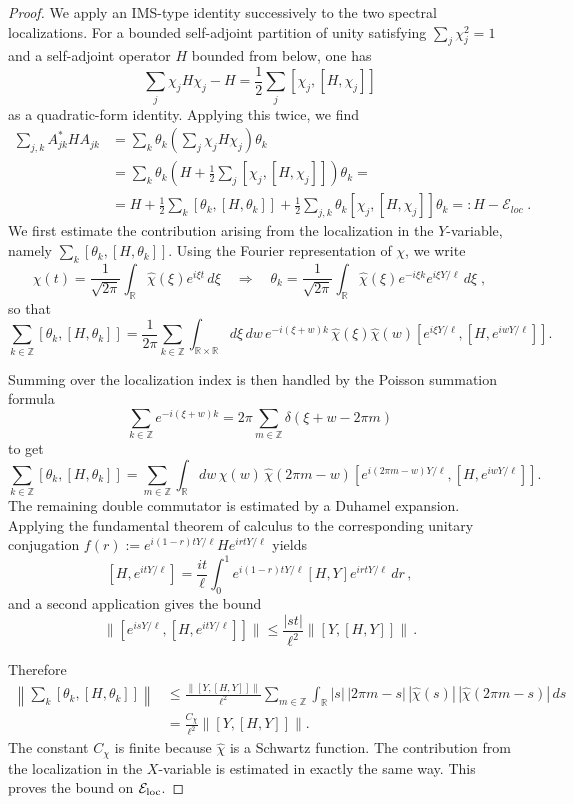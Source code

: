 \documentclass[11pt]{amsart}
\theoremstyle{definition}
\numberwithin{equation}{section}
\newcommand{\R}{\mathbb R}
\newcommand{\Z}{\mathbb Z}
\newcommand{\1}{\mathbf 1}
\begin{document}
\begin{proof}
We apply an IMS-type identity successively to the two spectral localizations. For a bounded self-adjoint partition of unity satisfying $\sum_j\chi_j^2=1$ and a self-adjoint operator $H$ bounded from below, one has
\[
 \sum_j\chi_j H\chi_j - H
 =
 \frac12\sum_j[\chi_j,[H,\chi_j]]
\]
as a quadratic-form identity. Applying this twice, we find
\begin{align*}
   \sum_{j,k}A_{jk}^*HA_{jk}
 &=\sum_k\theta_k\left(\sum_j\chi_jH\chi_j\right)\theta_k \\
 &=\sum_k\theta_k \left(H + \frac{1}{2}\sum_{j}\left[\chi_j,[H, \chi_j]\right]\right)\theta_k = \\
 &= H + \frac{1}{2}\sum_{k}\left[\theta_k,[H, \theta_k]\right] + \frac{1}{2}\sum_{j,k} \theta_k\left[\chi_j,[H, \chi_j]\right] \theta_k =: H - \mathcal{E}_{loc}\;.
\end{align*}
We first estimate the contribution arising from the localization in the $Y$-variable, namely $\sum_k [\theta_k,[H,\theta_k]]$.
Using the Fourier representation of $\chi$, we write
\[
 \chi(t)=\frac1{\sqrt{2\pi}}
 \int_{\R}\widehat\chi(\xi)e^{i \xi t}\,d\xi \quad\Longrightarrow\quad \theta_k
 =
 \frac1{\sqrt{2\pi}}
 \int_{\R}\widehat\chi(\xi) e^{-i \xi k}e^{i \xi Y/\ell}\,d\xi\;,
\]
so that
\[
\sum_{k \in \Z} [\theta_k,[H,\theta_k]] = \frac{1}{2\pi}\sum_{k \in \mathbb{Z}}\int_{\mathbb{R}\times\mathbb{R}}d\xi\,dw\,e^{-i(\xi + w) k}\,\hat{\chi}(\xi)\hat{\chi}(w)  \left[e^{i\xi Y/\ell}, \left[H, e^{i w Y/\ell}\right]  \right] .
\]

Summing over the localization index is then handled by the Poisson summation formula
\[
 \sum_{k\in\Z}e^{-i(\xi+w)k}
 =
 2\pi\sum_{m\in\Z}\delta(\xi+w-2\pi m)
\]
to get
\[
\sum_{k \in \Z} [\theta_k,[H,\theta_k]] = \sum_{m \in \Z}\int_{\R}dw\,\hat{\chi}(w)\,\hat{\chi}(2\pi m - w)\left[e^{i(2 \pi m - w) Y / \ell}, \left[H, e^{i w Y/ \ell}\right]  \right].
\]
The remaining double commutator is estimated by a Duhamel expansion. Applying the fundamental theorem of calculus to the corresponding unitary conjugation $f(r) := e^{i(1-r)tY/\ell}He^{irtY/\ell}$ yields
\[
 [H,e^{itY/\ell}]
 =
 \frac{it}{\ell}
 \int_0^1
 e^{i(1-r)tY/\ell}[H,Y]e^{irtY/\ell}\,dr\,,
\]
and a second application gives the bound
\[
 \|[e^{isY/\ell},[H,e^{itY/\ell}]]\|
 \le
 \frac{|st|}{\ell^2}\|[Y,[H,Y]]\|\,.
\]

Therefore
\begin{align*}
 \left\|\sum_k[\theta_k,[H,\theta_k]]\right\|
 &\le
 \frac{\|[Y,[H,Y]]\|}{\ell^2}
 \sum_{m\in\Z}\int_{\R}
 |s|\,|2\pi m-s|\,
 |\widehat\chi(s)|\,|\widehat\chi(2\pi m-s)|\,ds\\
 &=\frac{C_{\chi}}{\ell^2}
 \|[Y,[H,Y]]\|.
\end{align*}
The constant $C_\chi$ is finite because $\widehat\chi$ is a Schwartz function. The contribution from the localization in the $X$-variable is estimated in exactly the same way. This proves the bound on $\mathcal E_{\rm loc}$.


\end{proof}
\end{document}

